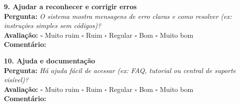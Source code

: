 \textbf{9. Ajudar a reconhecer e corrigir erros} \\
\textbf{Pergunta:} \textit{O sistema mostra mensagens de erro claras e como resolver (ex: instruções simples sem códigos)?} \\
\textbf{Avaliação:} $\square$ Muito ruim \hspace{0.5cm} $\square$ Ruim \hspace{0.5cm} $\square$ Regular \hspace{0.5cm} $\square$ Bom \hspace{0.5cm} $\square$ Muito bom \\
\textbf{Comentário:} \underline{\hspace{12cm}}

\textbf{10. Ajuda e documentação} \\
\textbf{Pergunta:} \textit{Há ajuda fácil de acessar (ex: FAQ, tutorial ou central de suporte visível)?} \\
\textbf{Avaliação:} $\square$ Muito ruim \hspace{0.5cm} $\square$ Ruim \hspace{0.5cm} $\square$ Regular \hspace{0.5cm} $\square$ Bom \hspace{0.5cm} $\square$ Muito bom \\
\textbf{Comentário:} \underline{\hspace{12cm}}